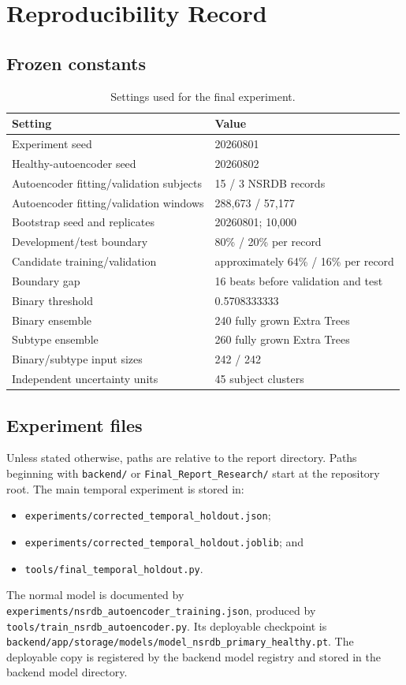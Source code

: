 \chapter{Reproducibility Record}
\begingroup
\small
{}

\section{Frozen constants}

\begin{table}[H]
\centering
\caption{Settings used for the final experiment.}
\begin{tabular}{ll}
\toprule
Setting & Value\\
\midrule
Experiment seed & 20260801\\
Healthy-autoencoder seed & 20260802\\
Autoencoder fitting/validation subjects & 15 / 3 NSRDB records\\
Autoencoder fitting/validation windows & 288,673 / 57,177\\
Bootstrap seed and replicates & 20260801; 10,000\\
Development/test boundary & 80\% / 20\% per record\\
Candidate training/validation & approximately 64\% / 16\% per record\\
Boundary gap & 16 beats before validation and test\\
Binary threshold & 0.5708333333\\
Binary ensemble & 240 fully grown Extra Trees\\
Subtype ensemble & 260 fully grown Extra Trees\\
Binary/subtype input sizes & 242 / 242\\
Independent uncertainty units & 45 subject clusters\\
\bottomrule
\end{tabular}
\end{table}

\section{Experiment files}

Unless stated otherwise, paths are relative to the report directory.
Paths beginning with \nolinkurl{backend/} or
\nolinkurl{Final_Report_Research/} start at the repository root.
The main temporal experiment is stored in:
\begin{itemize}
    \item \nolinkurl{experiments/corrected_temporal_holdout.json};
    \item \nolinkurl{experiments/corrected_temporal_holdout.joblib}; and
    \item \nolinkurl{tools/final_temporal_holdout.py}.
\end{itemize}
The normal model is documented by
\nolinkurl{experiments/nsrdb_autoencoder_training.json}, produced by
\nolinkurl{tools/train_nsrdb_autoencoder.py}. Its deployable checkpoint is
\nolinkurl{backend/app/storage/models/model_nsrdb_primary_healthy.pt}.
The deployable copy is registered by the backend model registry and stored in
the backend model directory.


